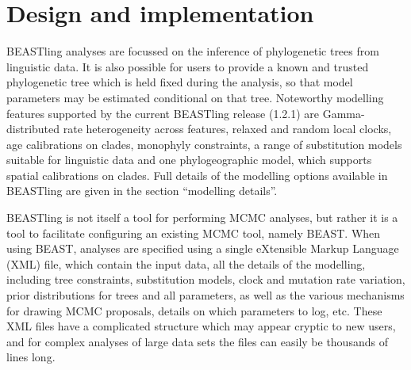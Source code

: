 \documentclass[twocolumn,10pt]{scrartcl}
\begin{document}
\section{Design and implementation}

BEASTling analyses are focussed on the inference of phylogenetic trees from linguistic data.  It is also possible for users to provide a known and trusted phylogenetic tree which is held fixed during the analysis, so that model parameters may be estimated conditional on that tree.  Noteworthy modelling features supported by the current BEASTling release (1.2.1) are Gamma-distributed rate heterogeneity across features, relaxed and random local clocks, age calibrations on clades, monophyly constraints, a range of substitution models suitable for linguistic data and one phylogeographic model, which supports spatial calibrations on clades.  Full details of the modelling options available in BEASTling are given in the section ``modelling details''.

BEASTling is not itself a tool for performing MCMC analyses, but rather it is a tool to facilitate configuring an existing MCMC tool, namely BEAST.  When using BEAST, analyses are specified using a single eXtensible Markup Language (XML) file, which contain the input data, all the details of the modelling, including tree constraints, substitution models, clock and mutation rate variation, prior distributions for trees and all parameters, as well as the various mechanisms for drawing MCMC proposals, details on which parameters to log, etc.  These XML files have a complicated structure which may appear cryptic to new users, and for complex analyses of large data sets the files can easily be thousands of lines long.
\end{document}
